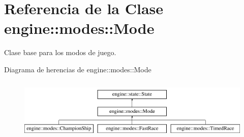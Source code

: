 \hypertarget{classengine_1_1modes_1_1Mode}{
\section{\-Referencia de la \-Clase engine\-:\-:modes\-:\-:\-Mode}
\label{classengine_1_1modes_1_1Mode}
}


\-Clase base para los modos de juego.  


\-Diagrama de herencias de engine\-:\-:modes\-:\-:\-Mode\begin{figure}[H]
\begin{center}
\leavevmode
\includegraphics[height=2.994653cm]{classengine_1_1modes_1_1Mode}
\end{center}
\end{figure}
